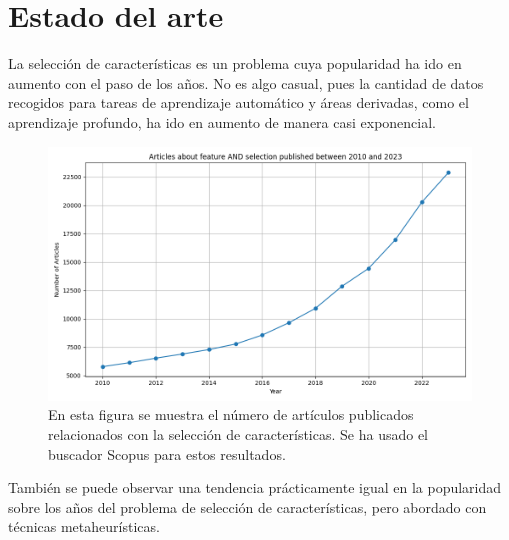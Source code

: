 \chapter{Estado del arte}
La selección de características es un problema cuya popularidad ha ido en aumento con el paso de los años. No es algo casual, pues la cantidad de datos recogidos para tareas de aprendizaje automático y áreas derivadas, como el aprendizaje profundo, ha ido en aumento de manera casi exponencial.

\begin{figure}[H]
    \begin{center}
        \includegraphics[width=1\textwidth]{imagenes/scopus_chart.png}
    \end{center}
    \caption[Popularidad de feature selection sobre los años]{En esta figura se muestra el número de artículos publicados relacionados con la selección de características. Se ha usado el buscador Scopus para estos resultados.}
    \label{fig:pop_fs}
\end{figure}

También se puede observar una tendencia  prácticamente igual en la popularidad sobre los años del problema de selección de características, pero abordado con técnicas metaheurísticas.

